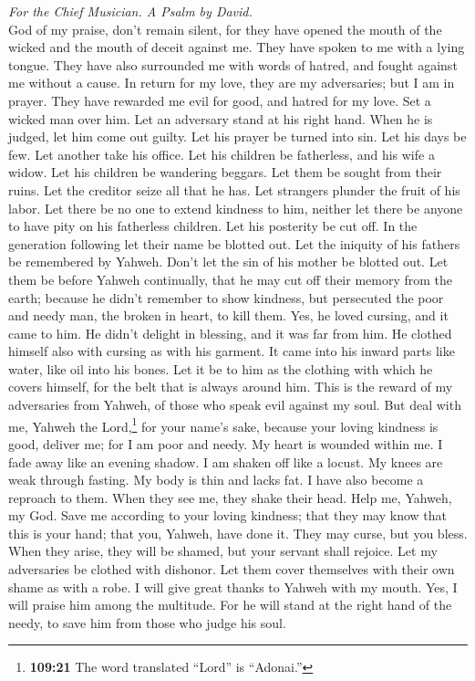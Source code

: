\emph{For the Chief Musician. A Psalm by David.}\\
 God of my praise, don't remain silent,  for
they have opened the mouth of the wicked and the mouth of deceit against
me. They have spoken to me with a lying tongue.  They have
also surrounded me with words of hatred, and fought against me without a
cause.  In return for my love, they are my adversaries;
but I am in prayer.  They have rewarded me evil for good,
and hatred for my love.  Set a wicked man over him. Let an
adversary stand at his right hand.  When he is judged, let
him come out guilty. Let his prayer be turned into sin. 
Let his days be few. Let another take his office.  Let his
children be fatherless, and his wife a widow.  Let his
children be wandering beggars. Let them be sought from their ruins.
 Let the creditor seize all that he has. Let strangers
plunder the fruit of his labor.  Let there be no one to
extend kindness to him, neither let there be anyone to have pity on his
fatherless children.  Let his posterity be cut off. In
the generation following let their name be blotted out. 
Let the iniquity of his fathers be remembered by Yahweh. Don't let the
sin of his mother be blotted out.  Let them be before
Yahweh continually, that he may cut off their memory from the earth;
 because he didn't remember to show kindness, but
persecuted the poor and needy man, the broken in heart, to kill them.
 Yes, he loved cursing, and it came to him. He didn't
delight in blessing, and it was far from him.  He clothed
himself also with cursing as with his garment. It came into his inward
parts like water, like oil into his bones.  Let it be to
him as the clothing with which he covers himself, for the belt that is
always around him.  This is the reward of my adversaries
from Yahweh, of those who speak evil against my soul. 
But deal with me, Yahweh the Lord,\footnote{\textbf{109:21} The word
  translated ``Lord'' is ``Adonai.''} for your name's sake, because your
loving kindness is good, deliver me;  for I am poor and
needy. My heart is wounded within me.  I fade away like
an evening shadow. I am shaken off like a locust.  My
knees are weak through fasting. My body is thin and lacks fat.
 I have also become a reproach to them. When they see me,
they shake their head.  Help me, Yahweh, my God. Save me
according to your loving kindness;  that they may know
that this is your hand; that you, Yahweh, have done it. 
They may curse, but you bless. When they arise, they will be shamed, but
your servant shall rejoice.  Let my adversaries be
clothed with dishonor. Let them cover themselves with their own shame as
with a robe.  I will give great thanks to Yahweh with my
mouth. Yes, I will praise him among the multitude.  For
he will stand at the right hand of the needy, to save him from those who
judge his soul.

